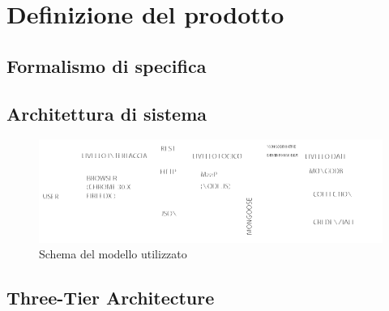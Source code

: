 \section{Definizione del prodotto}

\subsection{Formalismo di specifica}

\subsection{Architettura di sistema}

\begin{figure}
\centering
\includegraphics[scale=7]{3-TIER.png}
\caption{Schema del modello utilizzato}\label{fig:1}
\end{figure}

\subsection{Three-Tier Architecture}

